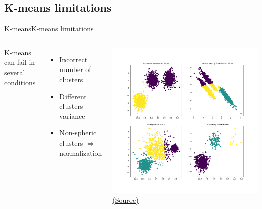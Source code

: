 \documentclass[10pt,compress]{beamer} %
\begin{document}
\subsection{K-means limitations}
\begin{frame}{K-means}{K-means limitations}
    \begin{columns}
    K-means can fail in several conditions
       \begin{itemize}
        \item Incorrect number of clusters
        \item Different clusters variance
        \item Non-spheric clusters $\Rightarrow$ normalization
       \end{itemize}
	\centering \includegraphics[width=\textwidth]{figs/kmeans-fails.png}\\
    \tiny{\href{https://scikit-learn.org/stable/auto_examples/cluster/plot_kmeans_assumptions.html}{(Source)}}
    \end{columns}
\end{frame}
\end{document}
